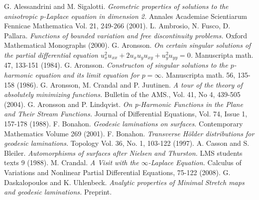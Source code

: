 \documentclass{ip-journal}
\theoremstyle{definition}
\numberwithin{equation}{section}
\begin{document}
\begin{thebibliography}{ABC}
 G. Alessandrini and M. Sigalotti.
{\it Geometric properties of solutions to the anisotropic p-Laplace equation in dimension 2.} Annales Academiae Scientiarum Fennicae Mathematica Vol. 21, 249-266 (2001).
 L. Ambrosio, N. Fusco, D. Pallara. {\it{Functions of bounded variation and free discontinuity problems.}} Oxford Mathematical Monographs (2000).
 G. Aronsson. {\it On certain singular solutions of the partial differential equation
$u_x^2u_{xx}+2u_xu_yu_{xy}+u_y^2u_{yy}=0$.}
Manuscripta math. 47, 133-151 (1984).
  G. Aronsson. {\it Constructon of  singular solutions to the $p$-harmonic  equation and its limit equation for $p=\infty$}.
 Manuscripta math. 56, 135-158 (1986).
  G. Aronsson, M. Crandal and P. Juutinen. {\it {A tour of the theory of absolutely minimizing functions.}}
Bulletin of the AMS., Vol. 41, No 4, 439-505 (2004).
  G. Aronsson and P. Lindqvist. {\it{On p-Harmonic Functions in the Plane and Their Stream Functions.}} Journal of Differential Equations, Vol. 74, Issue 1, 157-178 (1988).
 F. Bonahon. {\it Geodesic laminations on surfaces.} Contemporary Mathematics Volume 269 (2001).
 F. Bonahon. {\it Transverse H\"older distributions for geodesic laminations.} Topology Vol. 36, No. 1, 103-122  (1997).
 A. Casson and S. Bleiler. {\it Automorphisms of surfaces after Nielsen and Thurston.} LMS students texts 9 (1988).
 M. Crandal.
{\it A Visit with the $\infty$-Laplace Equation.} Calculus of Variations and Nonlinear Partial Differential Equations, 75-122 (2008).
 G. Daskalopoulos and K. Uhlenbeck. {\it Analytic properties of Minimal Stretch maps and geodesic laminations.} Preprint.

\end{thebibliography}
\end{document}
